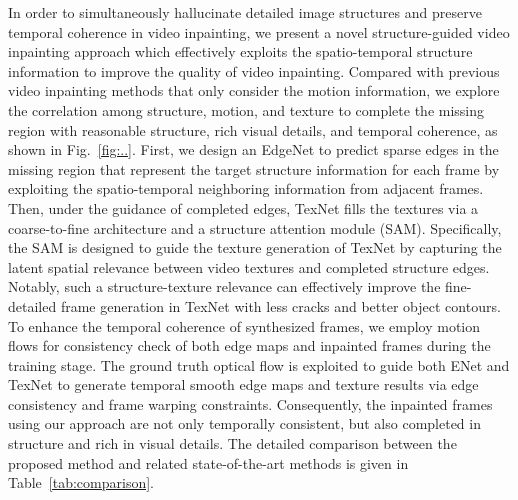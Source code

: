 In order to simultaneously hallucinate detailed image structures and preserve temporal coherence in video inpainting, we present a novel structure-guided video inpainting approach which effectively exploits the spatio-temporal structure information to improve the quality of video inpainting.  
%
Compared with previous video inpainting methods that only consider the motion information, we explore the correlation among structure, motion, and texture to complete the missing region with reasonable structure, rich visual details, and temporal coherence, as shown in Fig.~\ref{fig:..}.
First, we design an EdgeNet to predict sparse edges in the missing region that represent the target structure information for each frame by exploiting the spatio-temporal neighboring information from adjacent frames.
Then, under the guidance of completed edges, TexNet fills the textures via a coarse-to-fine architecture and a structure attention module (SAM).
Specifically, the SAM is designed to guide the texture generation of TexNet by capturing the latent spatial relevance between video textures and completed structure edges.
Notably, such a structure-texture relevance can effectively improve the fine-detailed frame generation in TexNet with less cracks and better object contours.
To enhance the temporal coherence of synthesized frames, we employ motion flows for consistency check of both edge maps and inpainted frames during the training stage.
%
The ground truth optical flow is exploited to guide both ENet and TexNet to generate temporal smooth edge maps and texture results via edge consistency and frame warping constraints.
Consequently, the inpainted frames using our approach are not only temporally consistent, but also completed in structure and rich in visual details.
The detailed comparison between the proposed method and related state-of-the-art methods is given in Table~\ref{tab:comparison}.



